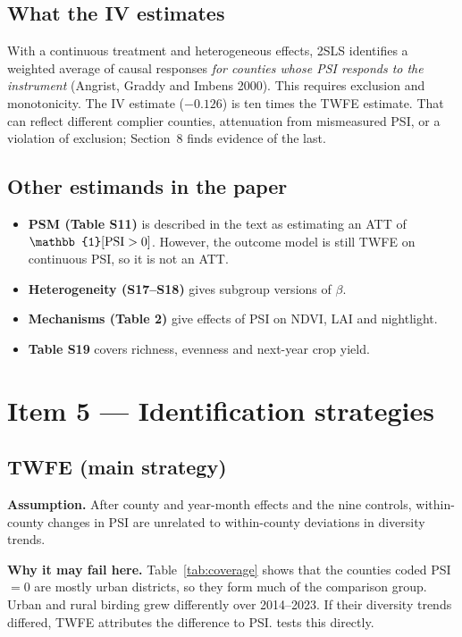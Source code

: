\documentclass[11pt]{article}
\begin{document}
\subsection{What the IV estimates}
With a continuous treatment and heterogeneous effects, 2SLS identifies a weighted average of causal responses \emph{for counties whose PSI responds to the instrument} (Angrist, Graddy and Imbens 2000). This requires exclusion and monotonicity. The IV estimate ($-0.126$) is ten times the TWFE estimate. That can reflect different complier counties, attenuation from mismeasured PSI, or a violation of exclusion; Section~8 finds evidence of the last.

\subsection{Other estimands in the paper}
\begin{itemize}
\item \textbf{PSM (Table S11)} is described in the text as estimating an ATT of $\mathbb{1}[\PSI>0]$. However, the outcome model is still TWFE on continuous PSI, so it is not an ATT.
\item \textbf{Heterogeneity (S17--S18)} gives subgroup versions of $\beta$.
\item \textbf{Mechanisms (Table 2)} give effects of PSI on NDVI, LAI and nightlight.
\item \textbf{Table S19} covers richness, evenness and next-year crop yield.
\end{itemize}

\section{Item 5 --- Identification strategies}

\subsection{TWFE (main strategy)}
\textbf{Assumption.} After county and year-month effects and the nine controls, within-county changes in PSI are unrelated to within-county deviations in diversity trends.

\textbf{Why it may fail here.} Table~\ref{tab:coverage} shows that the counties coded PSI\,$=0$ are mostly urban districts, so they form much of the comparison group. Urban and rural birding grew differently over 2014--2023. If their diversity trends differed, TWFE attributes the difference to PSI.  tests this directly.
\end{document}
